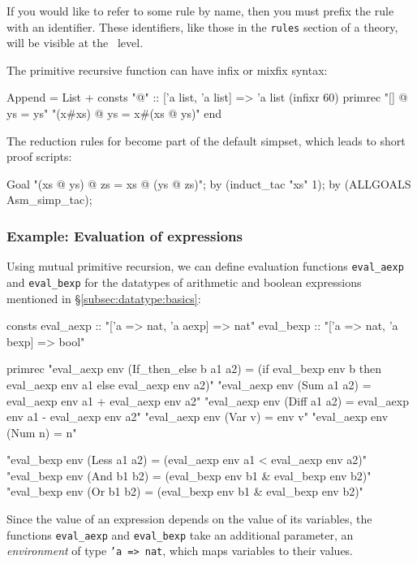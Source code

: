 If you would like to refer to some rule by name, then you must prefix
the rule with an identifier.  These identifiers, like those in the
\texttt{rules} section of a theory, will be visible at the \ML\ level.

The primitive recursive function can have infix or mixfix syntax:
\begin{ttbox}\underscoreon
Append = List +
consts "@"  :: ['a list, 'a list] => 'a list  (infixr 60)
primrec
   "[] @ ys = ys"
   "(x#xs) @ ys = x#(xs @ ys)"
end
\end{ttbox}

The reduction rules for {\tt\at} become part of the default simpset, which
leads to short proof scripts:
\begin{ttbox}\underscoreon
Goal "(xs @ ys) @ zs = xs @ (ys @ zs)";
by (induct\_tac "xs" 1);
by (ALLGOALS Asm\_simp\_tac);
\end{ttbox}

\subsubsection{Example: Evaluation of expressions}
Using mutual primitive recursion, we can define evaluation functions {\tt eval_aexp}
and {\tt eval_bexp} for the datatypes of arithmetic and boolean expressions mentioned in
\S\ref{subsec:datatype:basics}:
\begin{ttbox}
consts
  eval_aexp :: "['a => nat, 'a aexp] => nat"
  eval_bexp :: "['a => nat, 'a bexp] => bool"

primrec
  "eval_aexp env (If_then_else b a1 a2) =
     (if eval_bexp env b then eval_aexp env a1 else eval_aexp env a2)"
  "eval_aexp env (Sum a1 a2) = eval_aexp env a1 + eval_aexp env a2"
  "eval_aexp env (Diff a1 a2) = eval_aexp env a1 - eval_aexp env a2"
  "eval_aexp env (Var v) = env v"
  "eval_aexp env (Num n) = n"

  "eval_bexp env (Less a1 a2) = (eval_aexp env a1 < eval_aexp env a2)"
  "eval_bexp env (And b1 b2) = (eval_bexp env b1 & eval_bexp env b2)"
  "eval_bexp env (Or b1 b2) = (eval_bexp env b1 & eval_bexp env b2)"
\end{ttbox}
Since the value of an expression depends on the value of its variables,
the functions {\tt eval_aexp} and {\tt eval_bexp} take an additional
parameter, an {\em environment} of type {\tt 'a => nat}, which maps
variables to their values.

